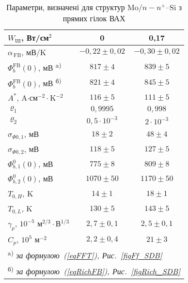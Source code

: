 \begin{table}
\caption{Параметри, визначені для структур Mo$/n-n^+$--Si з прямих гілок ВАХ}
\label{tabSDBPar}
\centering
\begin{tabular}{|l|c|c|}
\hline
$W_\mathtt{US}$,  Вт/см$^2$ &0&0,17\\\hline
\hline
$\alpha_\mathrm{\,FB}$, мВ/K &$-0,22\pm0,02$&$-0,30\pm0,02$\\\hline
$\Phi_{b}^\mathrm{FB}(0)$, мВ \textsuperscript{ a)} &$817\pm4$ & $839\pm5$\\\hline
$\Phi_{b}^\mathrm{FB}(0)$, мВ \textsuperscript{ б)} &$821\pm4$ & $845\pm5$\\\hline
$A^*$, A$\cdot$см$^{-2}\cdot$K$^{-2}$ &$116\pm5$ & $111\pm5$\\\hline
$\varrho_1$ &$0,9995$ & $0,998$\\\hline
$\varrho_2$ &$0,5\cdot10^{-3}$ & $2\cdot10^{-3}$\\\hline
$\sigma_{\Phi0,1}$, мВ&$18\pm2$ & $48\pm4$\\\hline
$\sigma_{\Phi0,2}$, мВ&$118\pm5$ & $127\pm5$\\\hline
$\Phi_{b,1}^0(0)$, мВ&$775\pm8$ & $809\pm8$\\\hline
$\Phi_{b,2}^0(0)$, мВ&$1070\pm50$ & $1170\pm50$\\\hline
$T_{0,H}$, K&$14\pm1$&$18\pm1$\\\hline
$T_{0,L}$, K&$130\pm5$&$143\pm5$\\\hline
$\gamma_p$, $10^{-5}$ м$^{2/3}\cdot$В$^{1/3}$&$2,7\pm0,1$&$2,5\pm0,1$\\\hline
$C_p$, $10^{5}$ м$^{-2}$&$2,2\pm0,4$&$21\pm3$\\ \hline
\multicolumn{3}{l}{\textsuperscript{ a)} \emph{за формулою~(\ref{eqFFT}), Рис.~\ref{figFf_SDB} }}  \\
\multicolumn{3}{l}{\textsuperscript{ б)} \emph{за формулою~(\ref{eqRichFB}), Рис.~\ref{figRich_SDB} }} \\
\end{tabular}
\end{table}

